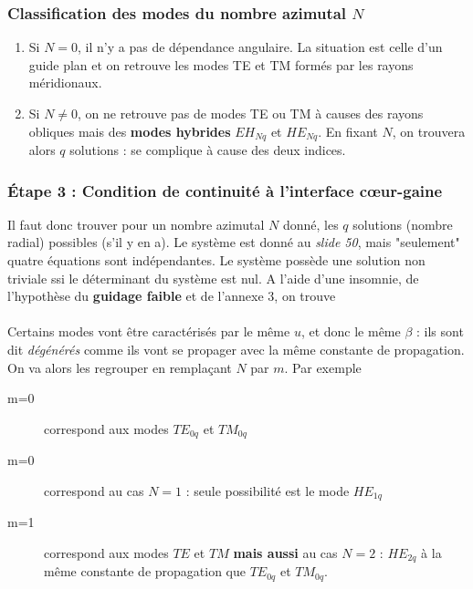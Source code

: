 \subsubsection{Classification des modes du nombre azimutal $N$}
\begin{enumerate}
\item Si $N=0$, il n'y a pas de dépendance angulaire. La situation est celle d'un guide plan et on retrouve les modes TE et TM formés par les rayons méridionaux.
\item Si $N\neq 0$, on ne retrouve pas de modes TE ou TM à causes des rayons obliques mais des \textbf{modes hybrides} $EH_{Nq}$ et $HE_{Nq}$. En fixant $N$, on trouvera alors $q$ solutions : se complique à cause des deux indices.
\end{enumerate}

\subsubsection{Étape 3 : Condition de continuité à l'interface cœur-gaine}
Il faut donc trouver pour un nombre azimutal $N$ donné, les $q$ solutions (nombre radial) possibles (s'il y en a). Le système est donné au \textit{slide 50}, mais "seulement" quatre équations sont indépendantes. Le système possède une solution non triviale ssi le déterminant du système est nul. A l'aide d'une insomnie, de l'hypothèse du \textbf{guidage faible} et de l'annexe 3, on trouve\\

\ \\

Certains modes vont être caractérisés par le même $u$, et donc le même $\beta$ : ils sont dit
\textit{dégénérés} comme ils vont se propager avec la même constante de propagation. On va alors
les regrouper en remplaçant $N$ par $m$. Par exemple
\begin{description}
\item[m=0] correspond aux modes $TE_{0q}$ et $TM_{0q}$
\item[m=0] correspond au cas $N=1$ : seule possibilité est le mode $HE_{1q}$
\item[m=1] correspond aux modes $TE$ et $TM$ \textbf{mais aussi} au cas $N=2$ : $HE_{2q}$ à 
la même constante de propagation que $TE_{0q}$ et $TM_{0q}$.
\end{description}

